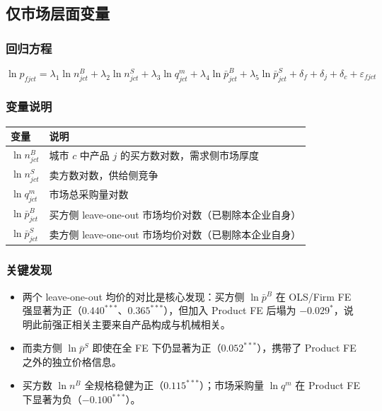 \documentclass[12pt]{article}
\begin{document}
\subsection{仅市场层面变量}

\subsubsection*{回归方程}

\begin{equation}
  \ln p_{fjct} = \lambda_1 \ln n^B_{jct} + \lambda_2 \ln n^S_{jct}
    + \lambda_3 \ln q^m_{jct} + \lambda_4 \ln\bar{p}^{B}_{jct} + \lambda_5 \ln\bar{p}^{S}_{jct}
    + \delta_f + \delta_j + \delta_c + \varepsilon_{fjct}
\end{equation}

\subsubsection*{变量说明}

\begin{table}[H]
  \centering\small
  \begin{tabular}{L{3.5cm} L{10cm}}
    \toprule
    变量 & 说明 \\
    \midrule
    $\ln n^B_{jct}$       & 城市 $c$ 中产品 $j$ 的买方数对数，需求侧市场厚度 \\[3pt]
    $\ln n^S_{jct}$       & 卖方数对数，供给侧竞争 \\[3pt]
    $\ln q^m_{jct}$       & 市场总采购量对数 \\[3pt]
    $\ln\bar{p}^{B}_{jct}$  & 买方侧 leave-one-out 市场均价对数（已剔除本企业自身） \\[3pt]
    $\ln\bar{p}^{S}_{jct}$  & 卖方侧 leave-one-out 市场均价对数（已剔除本企业自身） \\
    \bottomrule
  \end{tabular}
\end{table}

\subsubsection*{关键发现}

\begin{itemize}[nosep]
  \item 两个 leave-one-out 均价的对比是核心发现：买方侧 $\ln\bar{p}^{B}$ 在 OLS/Firm FE 强显著为正（$0.440^{***}$、$0.365^{***}$），但加入 Product FE 后塌为 $-0.029^{*}$，说明此前强正相关主要来自产品构成与机械相关。
  \item 而卖方侧 $\ln\bar{p}^{S}$ 即使在全 FE 下仍显著为正（$0.052^{***}$），携带了 Product FE 之外的独立价格信息。
  \item 买方数 $\ln n^B$ 全规格稳健为正（$0.115^{***}$）；市场采购量 $\ln q^m$ 在 Product FE 下显著为负（$-0.100^{***}$）。
\end{itemize}
\end{document}
